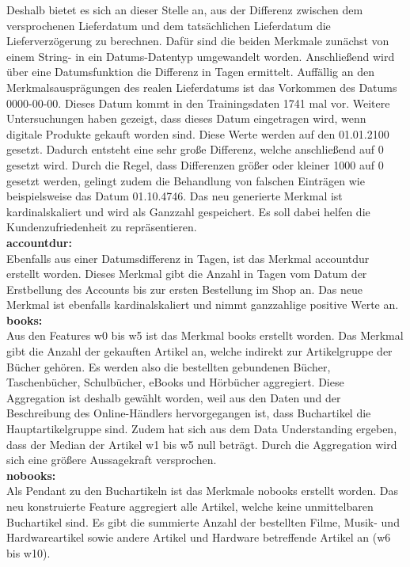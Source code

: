Deshalb bietet es sich an dieser Stelle an, aus der Differenz zwischen dem versprochenen Lieferdatum und dem tatsächlichen Lieferdatum die Lieferverzögerung zu berechnen. Dafür sind die beiden Merkmale zunächst von einem String- in ein Datums-Datentyp umgewandelt worden. Anschließend wird über eine Datumsfunktion die Differenz in Tagen ermittelt. Auffällig an den Merkmalsausprägungen des realen Lieferdatums ist das Vorkommen des Datums 0000-00-00. Dieses Datum kommt in den Trainingsdaten 1741 mal vor. Weitere Untersuchungen haben gezeigt, dass dieses Datum eingetragen wird, wenn digitale Produkte gekauft worden sind. Diese Werte werden auf den 01.01.2100 gesetzt. Dadurch entsteht eine sehr große Differenz, welche anschließend auf 0 gesetzt wird. Durch die Regel, dass Differenzen größer oder kleiner 1000 auf 0 gesetzt werden, gelingt zudem die Behandlung von falschen Einträgen wie beispielsweise das Datum 01.10.4746. Das neu generierte Merkmal ist kardinalskaliert und wird als Ganzzahl gespeichert. Es soll dabei helfen die Kundenzufriedenheit zu repräsentieren.\\

\textbf{accountdur:}\\

Ebenfalls aus einer Datumsdifferenz in Tagen, ist das Merkmal accountdur erstellt worden. Dieses Merkmal gibt die Anzahl in Tagen vom Datum der Erstbellung des Accounts bis zur ersten Bestellung im Shop an. Das neue Merkmal ist ebenfalls kardinalskaliert und nimmt ganzzahlige positive Werte an.\\

\textbf{books:}\\

Aus den Features w0 bis w5 ist das Merkmal books erstellt worden. Das Merkmal gibt die Anzahl der gekauften Artikel an, welche indirekt zur Artikelgruppe der Bücher gehören. Es werden also die bestellten gebundenen Bücher, Taschenbücher, Schulbücher, eBooks und Hörbücher aggregiert. Diese Aggregation ist deshalb gewählt worden, weil aus den Daten und der Beschreibung des Online-Händlers hervorgegangen ist, dass Buchartikel die Hauptartikelgruppe sind. Zudem hat sich aus dem Data Understanding ergeben, dass der Median der Artikel w1 bis w5 null beträgt. Durch die Aggregation wird sich eine größere Aussagekraft versprochen. \\

\textbf{nobooks:}\\

Als Pendant zu den Buchartikeln ist das Merkmale nobooks erstellt worden. Das neu konstruierte Feature aggregiert alle Artikel, welche keine unmittelbaren Buchartikel sind. Es gibt die summierte Anzahl der bestellten Filme, Musik- und Hardwareartikel sowie andere Artikel und Hardware betreffende Artikel an (w6 bis w10). \\

